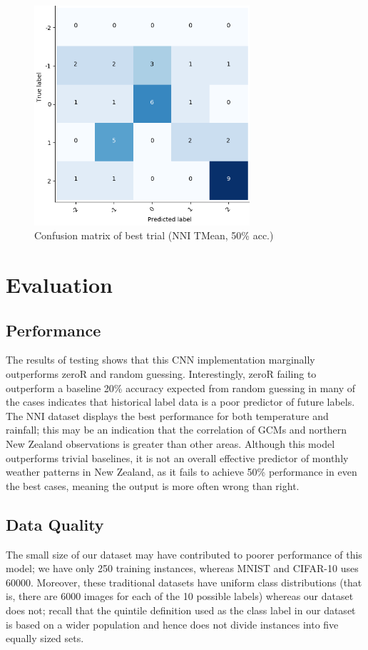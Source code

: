 \documentclass[11pt,a4paper, titlepage]{article}
\begin{document}
\begin{figure}[h]
	\begin{center}
	\includegraphics[width=8cm]{images/confusion1}
	\caption{Confusion matrix of best trial (NNI TMean, 50\% acc.)}
	\end{center}
\end{figure}

\pagebreak

\section{Evaluation}
\subsection{Performance}
The results of testing shows that this CNN implementation marginally outperforms zeroR and random guessing. Interestingly, zeroR failing to outperform a baseline 20\% accuracy expected from random guessing in many of the cases indicates that historical label data is a poor predictor of future labels. The NNI dataset displays the best performance for both temperature and rainfall; this may be an indication that the correlation of GCMs and northern New Zealand observations is greater than other areas. Although this model outperforms trivial baselines, it is not an overall effective predictor of monthly weather patterns in New Zealand, as it fails to achieve 50\% performance in even the best cases, meaning the output is more often wrong than right.

\subsection{Data Quality}
The small size of our dataset may have contributed to poorer performance of this model; we have only 250 training instances, whereas MNIST and CIFAR-10 uses 60000. Moreover, these traditional datasets have uniform class distributions (that is, there are 6000 images for each of the 10 possible labels) whereas our dataset does not; recall that the quintile definition used as the class label in our dataset is based on a wider population and hence does not divide instances into five equally sized sets. 
\end{document}
